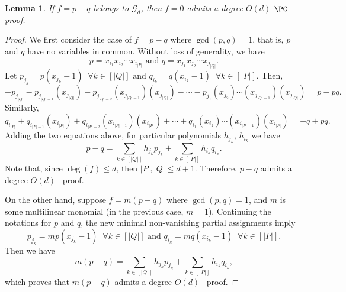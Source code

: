 \documentclass[11pt]{article}
\newtheorem{lemma}[theorem]{Lemma}
\begin{document}
\begin{lemma}\label{th:f_sos}
If $f=p-q$ belongs to $\mathcal{G}_d$, then $f=0$ admits a degree-$O(d)$ $\PC$ proof.
\end{lemma}
\begin{proof}
    We first consider the case of $f=p-q$ where $\gcd(p,q)=1$, that is, $p$ and $q$ have no variables in common. Without loss of generality, we have
\begin{equation*}
    p = x_{i_1}x_{i_2}\cdots x_{i_{|P|}} \textrm{ and } q = x_{j_1}x_{j_2}\cdots x_{j_{|Q|}}.
\end{equation*}
Let 
$p_{j_k} = p(x_{j_k}-1) \;\;\forall k\in [|Q|] \textrm{ and } q_{i_k} = q(x_{i_k}-1) \;\;\forall k\in [|P|].$
Then,
\begin{equation*}
    - p_{j_{|Q|}} - p_{j_{|Q|-1}}(x_{j_{|Q|}}) - p_{j_{|Q|-2}}(x_{j_{|Q|-1}})(x_{j_{|Q|}}) - \cdots - p_{j_{1}}(x_{j_2})\cdots(x_{j_{|Q|-1}})(x_{j_{|Q|}}) = p - pq.
\end{equation*}
Similarly, 
\begin{equation*}
    q_{i_{|P|}} + q_{i_{|P|-1}}(x_{i_{|P|}}) + q_{i_{|P|-2}}(x_{i_{|P|-1}})(x_{i_{|P|}}) + \cdots + q_{i_{1}}(x_{i_2})\cdots(x_{i_{|P|-1}})(x_{i_{|P|}}) = -q + pq.
\end{equation*}
Adding the two equations above, for particular polynomials $h_{j_k}$, $h_{i_k}$  we have
\begin{equation*}
    p - q = \sum_{k\in [|Q|]} h_{j_{k}}p_{j_{k}} + \sum_{k \in [|P|]} h_{i_{k}}q_{i_{k}}.
\end{equation*}
Note that, since $\deg(f) \leq d$, then $|P|,|Q| \leq d+1$. Therefore, $p-q$ admits a degree-$O(d)$ \PC\ proof.

On the other hand, suppose $f=m(p-q)$ where $\gcd(p,q)=1$, and $m$ is some multilinear monomial (in the previous case, $m=1$). Continuing the notations for $p$ and $q$, the new minimal non-vanishing partial assignments imply
\begin{equation*}
    p_{j_k} = mp(x_{j_k}-1) \;\;\forall k\in [|Q|] \textrm{ and } q_{i_k} = mq(x_{i_k}-1) \;\;\forall k\in [|P|].
\end{equation*}
Then we have
\begin{equation*}
    m(p - q) = \sum_{k\in [|Q|]} h_{j_{k}}p_{j_{k}} + \sum_{k \in [|P|]} h_{i_{k}}q_{i_{k}},
\end{equation*}
which proves that $m(p-q)$ admits a degree-$O(d)$ \PC\ proof.
\end{proof}
\end{document}
